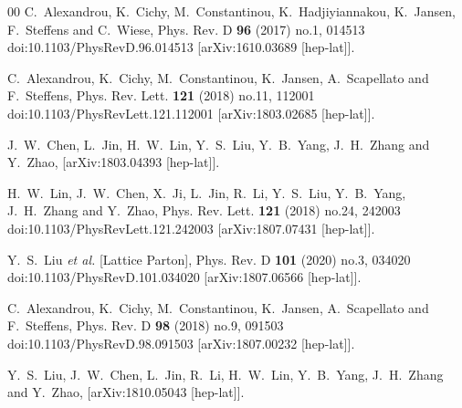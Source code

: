 \documentclass[preprint,12pt]{elsarticle}
\begin{document}
\begin{thebibliography}{00}
C.~Alexandrou, K.~Cichy, M.~Constantinou, K.~Hadjiyiannakou, K.~Jansen, F.~Steffens and C.~Wiese,
Phys. Rev. D \textbf{96} (2017) no.1, 014513
doi:10.1103/PhysRevD.96.014513
[arXiv:1610.03689 [hep-lat]].

C.~Alexandrou, K.~Cichy, M.~Constantinou, K.~Jansen, A.~Scapellato and F.~Steffens,
Phys. Rev. Lett. \textbf{121} (2018) no.11, 112001
doi:10.1103/PhysRevLett.121.112001
[arXiv:1803.02685 [hep-lat]].

J.~W.~Chen, L.~Jin, H.~W.~Lin, Y.~S.~Liu, Y.~B.~Yang, J.~H.~Zhang and Y.~Zhao,
[arXiv:1803.04393 [hep-lat]].

H.~W.~Lin, J.~W.~Chen, X.~Ji, L.~Jin, R.~Li, Y.~S.~Liu, Y.~B.~Yang, J.~H.~Zhang and Y.~Zhao,
Phys. Rev. Lett. \textbf{121} (2018) no.24, 242003
doi:10.1103/PhysRevLett.121.242003
[arXiv:1807.07431 [hep-lat]].

Y.~S.~Liu \textit{et al.} [Lattice Parton],
Phys. Rev. D \textbf{101} (2020) no.3, 034020
doi:10.1103/PhysRevD.101.034020
[arXiv:1807.06566 [hep-lat]].

C.~Alexandrou, K.~Cichy, M.~Constantinou, K.~Jansen, A.~Scapellato and F.~Steffens,
Phys. Rev. D \textbf{98} (2018) no.9, 091503
doi:10.1103/PhysRevD.98.091503
[arXiv:1807.00232 [hep-lat]].

Y.~S.~Liu, J.~W.~Chen, L.~Jin, R.~Li, H.~W.~Lin, Y.~B.~Yang, J.~H.~Zhang and Y.~Zhao,
[arXiv:1810.05043 [hep-lat]].


\end{thebibliography}
\end{document}
